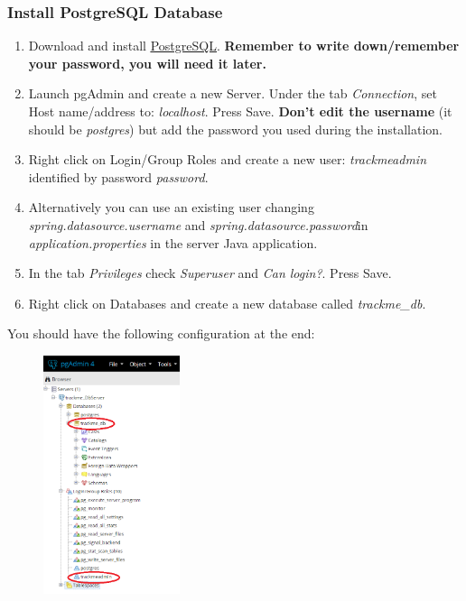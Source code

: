 \documentclass[a4paper]{article}
\begin{document}
\subsubsection{Install PostgreSQL Database}
\begin{enumerate}
    \item Download and install \href{https://www.enterprisedb.com/downloads/postgres-postgresql-downloads}{\underline{PostgreSQL}}. \textbf{Remember to write down/remember your password, you will need it later.}
    \item Launch pgAdmin and create a new Server. Under the tab \textit{Connection}, set Host name/address to: \textit{localhost}. Press Save. \textbf{Don't edit the username} (it should be \textit{postgres}) but add the password you used during the installation.
    \item Right click on Login/Group Roles and create a new user: \textit{trackmeadmin} identified by password \textit{password}. \item Alternatively you can use an existing user changing
    \newline\textit{spring.datasource.username} and \textit{spring.datasource.password}\newline in \textit{application.properties} in the server Java application.
    \item In the tab \textit{Privileges} check \textit{Superuser} and \textit{Can login?}. Press Save.
    \item Right click on Databases and create a new database called \textit{trackme\_db}.
\end{enumerate}
You should have the following configuration at the end:
\begin{figure}[!htpb]
    \centering
    \includegraphics[height=70mm]{ITD/images/postgresql_install.png}
\end{figure}
\newpage
\end{document}
